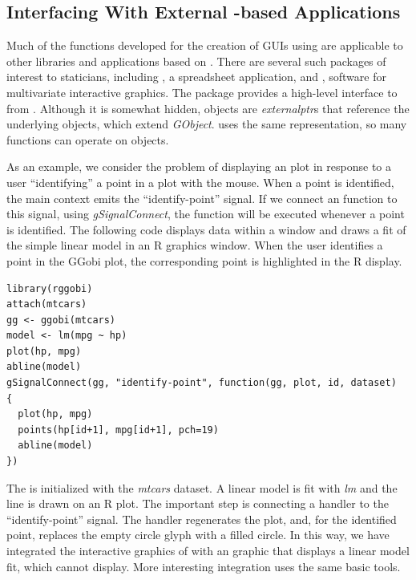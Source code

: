 \documentclass[article]{jss}
\begin{document}
\subsection[Interfacing With External GObject-based
Applications]{Interfacing With External -based
Applications}

Much of the  functions developed for the
creation of GUIs using  are applicable to other libraries
and applications based on . There are several such
packages of
interest to staticians, including , a spreadsheet
application, and
, software for multivariate interactive graphics. The
package \citep{rggobi} provides a high-level interface to 
from 
. Although it is somewhat hidden,  objects are 
\emph{externalptr}s that reference the underlying  objects,
which
extend \emph{GObject}.  uses the same 
representation, so
many  functions can operate on  objects.

As an example, we consider the problem of displaying an 
plot in
response to a user ``identifying'' a point in a  plot with
the mouse.
When a  point is identified, the main  context
emits
the ``identify-point'' signal. If we connect an  function
to
this signal, using \emph{gSignalConnect}, the function will be
executed whenever a point is identified. 
The following code displays data within a  window and
draws a fit of the simple linear model in an R graphics window.
When the user identifies a point in the GGobi plot, the corresponding
point is highlighted in the R display.
\begin{verbatim}
library(rggobi)
attach(mtcars)
gg <- ggobi(mtcars)
model <- lm(mpg ~ hp)
plot(hp, mpg)
abline(model)
gSignalConnect(gg, "identify-point", function(gg, plot, id, dataset)
{
  plot(hp, mpg)
  points(hp[id+1], mpg[id+1], pch=19)
  abline(model)
})
\end{verbatim}
The  is initialized with the \emph{mtcars} dataset. 
A linear model is fit with \emph{lm} and the line is drawn on an R
plot. The 
important step is connecting a handler to the ``identify-point''
signal. The
handler regenerates the  plot, and, for the identified
point, 
replaces the empty circle glyph with a filled circle.
In this way, we have integrated the interactive graphics of
 with an
 graphic that displays a linear model fit, which
 cannot
display. More interesting integration uses the same basic tools.
\end{document}
